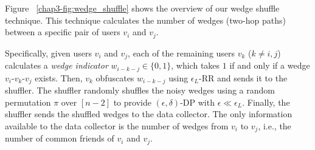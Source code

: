 

Figure ~\ref{chap3-fig:wedge_shuffle} shows the overview of our wedge shuffle technique. 
This technique calculates the number of wedges (two-hop paths) between 
a specific pair of users $v_i$ and $v_j$. 

Specifically, 
given users $v_i$ and $v_j$, 
each of the remaining users $v_k$ ($k \ne i, j$) 
calculates a \textit{wedge indicator} $w_{i-k-j} \in \{0,1\}$, 
which 
takes $1$ if and only if 
a wedge $v_i$-$v_k$-$v_j$ exists. 
Then, $v_k$ obfuscates $w_{i-k-j}$ using $\epsilon_L$-RR and sends it to the shuffler. 
The shuffler randomly shuffles the noisy wedges using a random permutation $\pi$ over $[n-2]$ 
to provide $(\epsilon, \delta)$-DP with $\epsilon \ll \epsilon_L$. 
Finally, the shuffler sends the shuffled wedges to the data collector. 
The only information available to the data collector is  the number of wedges from $v_i$ to $v_j$, i.e., the number of common friends of $v_i$ and $v_j$. 

